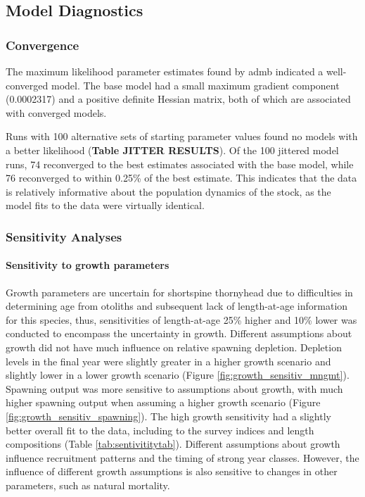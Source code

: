 \documentclass[11pt,
  english,
  letterpaper,
]{article}
\begin{document}
\hypertarget{model-diagnostics}{%
\subsection{Model Diagnostics}\label{model-diagnostics}}

\hypertarget{convergence}{%
\subsubsection{Convergence}\label{convergence}}

The maximum likelihood parameter estimates found by \gls{admb} indicated a well-converged model. The base model had a small maximum gradient component (0.0002317) and a positive definite Hessian matrix, both of which are associated with converged models.

Runs with 100 alternative sets of starting parameter values found no models with a better likelihood (\textbf{Table JITTER RESULTS}). Of the 100 jittered model runs, 74 reconverged to the best estimates associated with the base model, while 76 reconverged to within 0.25\% of the best estimate. This indicates that the data is relatively informative about the population dynamics of the stock, as the model fits to the data were virtually identical.

\hypertarget{sensitivity-analyses}{%
\subsubsection{Sensitivity Analyses}\label{sensitivity-analyses}}

\hypertarget{sensitivity-to-growth-parameters}{%
\paragraph{Sensitivity to growth parameters}\label{sensitivity-to-growth-parameters}}

Growth parameters are uncertain for shortspine thornyhead due to difficulties in determining age from otoliths and subsequent lack of length-at-age information for this species, thus, sensitivities of length-at-age 25\% higher and 10\% lower was conducted to encompass the uncertainty in growth. Different assumptions about growth did not have much influence on relative spawning depletion. Depletion levels in the final year were slightly greater in a higher growth scenario and slightly lower in a lower growth scenario (Figure \ref{fig:growth_sensitiv_mngmt}). Spawning output was more sensitive to assumptions about growth, with much higher spawning output when assuming a higher growth scenario (Figure \ref{fig:growth_sensitiv_spawning}). The high growth sensitivity had a slightly better overall fit to the data, including to the survey indices and length compositions (Table \ref{tab:sentivititytab}). Different assumptions about growth influence recruitment patterns and the timing of strong year classes. However, the influence of different growth assumptions is also sensitive to changes in other parameters, such as natural mortality.
\end{document}
